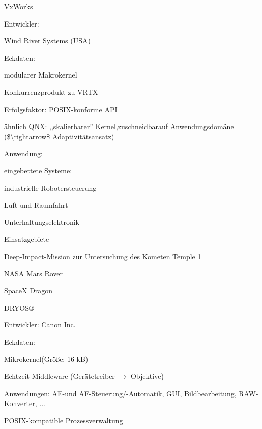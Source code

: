 \documentclass[a4paper]{article}
\begin{document}
\begin{multicols}{3}
    VxWorks

    \begin{itemize*}
        \item
        Entwickler:
        \begin{itemize*}
            \item Wind River Systems (USA)
        \end{itemize*}
        \item
        Eckdaten:
        \begin{itemize*}
            \item modularer Makrokernel
            \item Konkurrenzprodukt zu VRTX
            \item Erfolgsfaktor: POSIX-konforme API
            \item ähnlich QNX: ,,skalierbarer'' Kernel,zuschneidbarauf Anwendungsdomäne (\$\textbackslash rightarrow\$ Adaptivitätsansatz)
        \end{itemize*}
        \item
        Anwendung:
        \begin{itemize*}
            \item eingebettete Systeme:
            \item industrielle Robotersteuerung
            \item Luft-und Raumfahrt
            \item Unterhaltungselektronik
        \end{itemize*}
        \item
        Einsatzgebiete
        \begin{itemize*}
            \item Deep-Impact-Mission zur Untersuchung des Kometen Temple 1
            \item NASA Mars Rover
            \item SpaceX Dragon
        \end{itemize*}
    \end{itemize*}

    DRYOS®

    \begin{itemize*}
        \item
        Entwickler: Canon Inc.
        \item
        Eckdaten:
        \begin{itemize*}
            \item Mikrokernel(Größe: 16 kB)
            \item Echtzeit-Middleware (Gerätetreiber $\rightarrow$  Objektive)
            \item Anwendungen: AE-und AF-Steuerung/-Automatik, GUI, Bildbearbeitung, RAW-Konverter, ...
            \item POSIX-kompatible Prozessverwaltung
        \end{itemize*}
        \item
    \end{itemize*}


\end{multicols}
\end{document}

